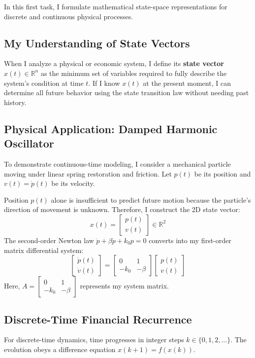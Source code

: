 \documentclass[12pt,a4paper]{article}
\theoremstyle{definition}
\theoremstyle{plain}
\begin{document}
In this first task, I formulate mathematical state-space representations for discrete and continuous physical processes.

\subsection{My Understanding of State Vectors}
When I analyze a physical or economic system, I define its \textbf{state vector} $x(t) \in \mathbb{R}^n$ as the minimum set of variables required to fully describe the system's condition at time $t$. If I know $x(t)$ at the present moment, I can determine all future behavior using the state transition law without needing past history.

\subsection{Physical Application: Damped Harmonic Oscillator}
To demonstrate continuous-time modeling, I consider a mechanical particle moving under linear spring restoration and friction. Let $p(t)$ be its position and $v(t) = \dot{p}(t)$ be its velocity. 

Position $p(t)$ alone is insufficient to predict future motion because the particle's direction of movement is unknown. Therefore, I construct the 2D state vector:
\[
x(t) = \begin{bmatrix} p(t) \\ v(t) \end{bmatrix} \in \mathbb{R}^2
\]
The second-order Newton law $\ddot{p} + \beta \dot{p} + k_0 p = 0$ converts into my first-order matrix differential system:
\[
\begin{bmatrix} \dot{p}(t) \\ \dot{v}(t) \end{bmatrix} = \begin{bmatrix} 0 & 1 \\ -k_0 & -\beta \end{bmatrix} \begin{bmatrix} p(t) \\ v(t) \end{bmatrix}
\]
Here, $A = \begin{bmatrix} 0 & 1 \\ -k_0 & -\beta \end{bmatrix}$ represents my system matrix.

\subsection{Discrete-Time Financial Recurrence}
For discrete-time dynamics, time progresses in integer steps $k \in \{0, 1, 2, \dots\}$. The evolution obeys a difference equation $x(k+1) = f(x(k))$.
\end{document}
